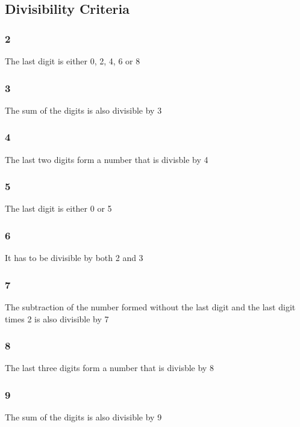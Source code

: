 \subsection{Divisibility Criteria}
\subsubsection{2}
The last digit is either 0, 2, 4, 6 or 8
\subsubsection{3}
The sum of the digits is also divisible by 3
\subsubsection{4}
The last two digits form a number that is divisble by 4
\subsubsection{5}
The last digit is either 0 or 5
\subsubsection{6}
It has to be divisible by both 2 and 3
\subsubsection{7}
The subtraction of the number formed without the last digit and the last digit times 2 is also divisible by 7
\subsubsection{8}
The last three digits form a number that is divisble by 8
\subsubsection{9}
The sum of the digits is also divisible by 9